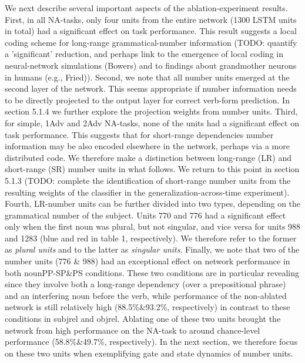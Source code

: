 We next describe several important aspects of the ablation-experiment results. 
First, in all NA-tasks, only four units from the entire network (1300 LSTM units in total) had a significant effect on task performance. 
This result suggests a local coding scheme for long-range grammatical-number information (TODO: quantify a 'significant' reduction, and perhaps link to the emergence of local coding in neural-network simulations (Bowers) and to findings about grandmother neurons in humans (e.g., Fried)). 
Second, we note that all number units emerged at the second layer of the network. 
This seems appropriate if number information needs to be directly projected to the output layer for correct verb-form prediction. 
In section 5.1.4 we further explore the projection weights from number units. 
Third, for simple, 1Adv and 2Adv NA-tasks, none of the units had a significant effect on task performance. 
This suggests that for short-range dependencies number information may be also encoded elsewhere in the network, perhaps via a more distributed code. 
We therefore make a distinction between long-range (LR) and short-range (SR) number units in what follows. 
We return to this point in section 5.1.3 (TODO: complete the identification of short-range number units from the resulting weights of the classifier in the generalization-across-time experiment). 
Fourth, LR-number units can be further divided into two types, depending on the grammatical number of the subject. 
Units 770 and 776 had a significant effect only when the first noun was plural, but not singular, and vice versa for units 988 and 1283 (blue and red in table 1, respectively). 
We therefore refer to the former as \textit{plural units} and to the latter as \textit{singular units}. 
Finally, we note that two of the number units (776 \& 988) had an exceptional effect on network performance in both nounPP-SP\&PS conditions. 
These two conditions are in particular revealing since they involve both a long-range dependency (over a prepositional phrase) and an interfering noun before the verb, while performance of the non-ablated network is still relatively high (88.5\%\&93.2\%, respectively) in contrast to these conditions in subjrel and objrel. 
Ablating one of these two units brought the network from high performance on the NA-task to around chance-level performance (58.8\%\&49.7\%, respectively). 
In the next section, we therefore focus on these two units when exemplifying gate and state dynamics of number units. 

